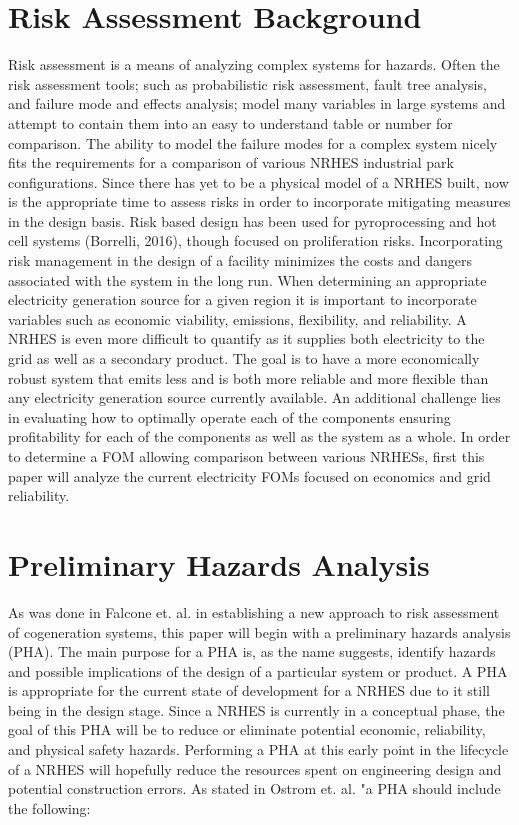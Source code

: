 \documentclass[12pt]{UIdahoMastersThesis}
\begin{document}
\section{Risk Assessment Background}
Risk assessment is a means of analyzing complex systems for hazards. Often the risk assessment tools; such as probabilistic risk assessment, fault tree analysis, and failure mode and effects analysis; model many variables in large systems and attempt to contain them into an easy to understand table or number for comparison. The ability to model the failure modes for a complex system nicely fits the requirements for a comparison of various NRHES industrial park configurations. Since there has yet to be a physical model of a NRHES built, now is the appropriate time to assess risks in order to incorporate mitigating measures in the design basis. Risk based design has been used for pyroprocessing and hot cell systems (Borrelli, 2016), though focused on proliferation risks. Incorporating risk management in the design of a facility minimizes the costs and dangers associated with the system in the long run.
	When determining an appropriate electricity generation source for a given region it is important to incorporate variables such as economic viability, emissions, flexibility, and reliability. A NRHES is even more difficult to quantify as it supplies both electricity to the grid as well as a secondary product. The goal is to have a more economically robust system that emits less and is both more reliable and more flexible than any electricity generation source currently available. An additional challenge lies in evaluating how to optimally operate each of the components ensuring profitability for each of the components as well as the system as a whole. In order to determine a FOM allowing comparison between various NRHESs, first this paper will analyze the current electricity FOMs focused on economics and grid reliability. 

\section{Preliminary Hazards Analysis}
As was done in Falcone et. al. in establishing a new approach to risk assessment of cogeneration systems, this paper will begin with a preliminary hazards analysis (PHA). The main purpose for a PHA is, as the name suggests, identify hazards and possible implications of the design of a particular system or product.  A PHA is appropriate for the current state of development for a NRHES due to it still being in the design stage. Since a NRHES is currently in a conceptual phase, the goal of this PHA will be to reduce or eliminate potential economic, reliability, and physical safety hazards. Performing a PHA at this early point in the lifecycle of a NRHES will hopefully reduce the resources spent on engineering design and potential construction errors. As stated in Ostrom et. al.  "a PHA should include the following:
\end{document}
